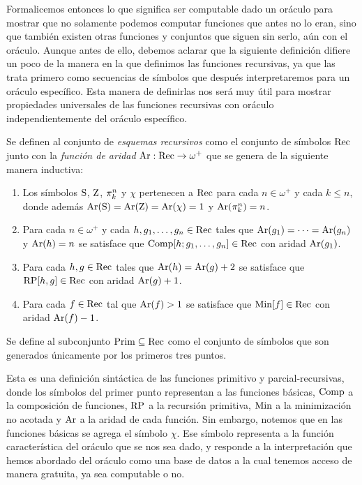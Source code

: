 Formalicemos entonces lo que significa ser computable dado un oráculo para mostrar que no solamente podemos computar funciones que antes no lo eran, sino que también existen otras funciones y conjuntos que siguen sin serlo, aún con el oráculo. Aunque antes de ello, debemos aclarar que la siguiente definición difiere un poco de la manera en la que definimos las funciones recursivas, ya que las trata primero como secuencias de símbolos que después interpretaremos para un oráculo específico. Esta manera de definirlas nos será muy útil para mostrar propiedades universales de las funciones recursivas con oráculo independientemente del oráculo específico. 

\begin{definition}
	Se definen al conjunto de \emph{esquemas recursivos} como el conjunto de símbolos $\RECURSIVO$ junto con la \emph{función de aridad} $\ARIDAD:\RECURSIVO\to\omega^{+}$ que se genera de la siguiente manera inductiva:
	\begin{enumerate}
		\item Los símbolos $\SUCESOR$, $\CERO$, $\PROYECCION{n}{k}$ y $\chi$ pertenecen a $\RECURSIVO$ para cada $n\in\omega^{+}$ y cada $k\leq n$, donde además $\ARIDAD\pa*{\SUCESOR} = \ARIDAD\pa*{\CERO} =\ARIDAD\pa*{\chi} = 1$ y $\ARIDAD\pa*{\PROYECCION{n}{k}} = n$.
		\item Para cada $n\in\omega^{+}$ y cada $h, g_{1},\dotsc, g_{n}\in\RECURSIVO$ tales que $\ARIDAD\pa*{g_{1}} =\dotsb =\ARIDAD\pa*{g_{n}}$ y $\ARIDAD\pa*{h} = n$ se satisface que $ \COMPOSICION\bra*{h; g_{1},\dotsc, g_{n}}\in\RECURSIVO$ con aridad $\ARIDAD\pa*{g_{1}}$.
		\item Para cada $h, g\in\RECURSIVO$ tales que $\ARIDAD\pa*{h} =\ARIDAD\pa*{g} + 2$ se satisface que $\RECURSION\bra*{h, g}\in\RECURSIVO$ con aridad $\ARIDAD\pa*{g} + 1$.
		\item Para cada $f\in\RECURSIVO$ tal que $\ARIDAD\pa*{f} > 1$ se satisface que $\MINIMIZACION\bra*{f}\in\RECURSIVO$ con aridad $\ARIDAD\pa*{f} - 1$.
	\end{enumerate}

	Se define al subconjunto $\PRIMITIVO\subseteq\RECURSIVO$ como el conjunto de símbolos que son generados únicamente por los primeros tres puntos.
\end{definition}

Esta es una definición sintáctica de las funciones primitivo y parcial-recursivas, donde los símbolos del primer punto representan a las funciones básicas, $\COMPOSICION$ a la composición de funciones, $\RECURSION$ a la recursión primitiva, $\MINIMIZACION$ a la minimización no acotada y $\ARIDAD$ a la aridad de cada función. Sin embargo, notemos que en las funciones básicas se agrega el símbolo $\chi$. Ese símbolo representa a la función característica del oráculo que se nos sea dado, y responde a la interpretación que hemos abordado del oráculo como una base de datos a la cual tenemos acceso de manera gratuita, ya sea computable o no.

